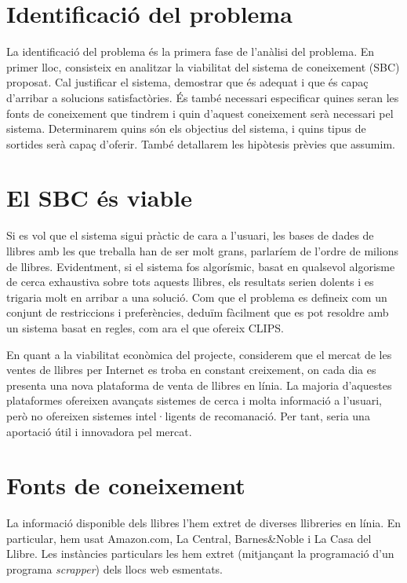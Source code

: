 
\section{Identificació del problema}

La identificació del problema és la primera fase de l'anàlisi del problema. En primer lloc, consisteix en analitzar la viabilitat del sistema de coneixement (SBC) proposat. Cal justificar el sistema, demostrar que és adequat i que és capaç d'arribar a solucions satisfactòries. És també necessari especificar quines seran les fonts de coneixement que tindrem i quin d'aquest coneixement serà necessari pel sistema. Determinarem quins són els objectius del sistema, i quins tipus de sortides serà capaç d'oferir. També detallarem les hipòtesis prèvies que assumim.

\section{El SBC és viable}

Si es vol que el sistema sigui pràctic de cara a l'usuari, les bases de dades de llibres amb les que treballa han de ser molt grans, parlaríem de l'ordre de milions de llibres. Evidentment, si el sistema fos algorísmic, basat en qualsevol algorisme de cerca exhaustiva sobre tots aquests llibres, els resultats serien dolents i es trigaria molt en arribar a una solució. Com que el problema es defineix com un conjunt de restriccions i preferències, deduïm fàcilment que es pot resoldre amb un sistema basat en regles, com ara el que ofereix CLIPS.

En quant a la viabilitat econòmica del projecte, considerem que el mercat de les ventes de llibres per Internet es troba en constant creixement, on cada dia es presenta una nova plataforma de venta de llibres en línia. La majoria d'aquestes plataformes ofereixen avançats sistemes de cerca i molta informació a l'usuari, però no ofereixen sistemes intel·ligents de recomanació. Per tant, seria una aportació útil i innovadora pel mercat.

\section{Fonts de coneixement}

La informació disponible dels llibres l'hem extret de diverses llibreries en línia. En particular, hem usat Amazon.com, La Central, Barnes\&Noble i La Casa del Llibre. Les instàncies particulars les hem extret (mitjançant la programació d'un programa \emph{scrapper}) dels llocs web esmentats.


